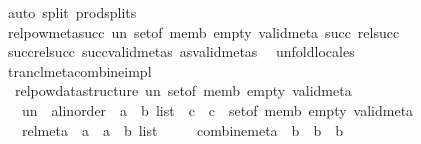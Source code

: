 \begin{isabellebody}
\ {\isacharparenleft}{\kern0pt}auto\ split{\isacharcolon}{\kern0pt}\ prod{\isachardot}{\kern0pt}splits{\isacharparenright}{\kern0pt}%
\endisatagproof
{\isafoldproof}%
%
\isadelimproof
\isanewline
%
\endisadelimproof
\isanewline
{}\isamarkupfalse%
\ relpow{\isacharunderscore}{\kern0pt}meta{\isacharunderscore}{\kern0pt}succ\ un\ set{\isacharunderscore}{\kern0pt}of\ memb\ empty\ valid{\isacharunderscore}{\kern0pt}meta\ succ\ rel{\isacharunderscore}{\kern0pt}succ\isanewline
%
\isadelimproof
\ \ %
\endisadelimproof
%
\isatagproof
{}\isamarkupfalse%
\ succ{\isacharunderscore}{\kern0pt}rel{\isacharunderscore}{\kern0pt}succ\ succ{\isacharunderscore}{\kern0pt}valid{\isacharunderscore}{\kern0pt}metas\ as{\isacharunderscore}{\kern0pt}valid{\isacharunderscore}{\kern0pt}metas\ \isamarkupfalse%
\ unfold{\isacharunderscore}{\kern0pt}locales%
\endisatagproof
{\isafoldproof}%
%
\isadelimproof
\isanewline
%
\endisadelimproof
\isanewline
{}\isamarkupfalse%
\isanewline
\isanewline
{}\isamarkupfalse%
\ trancl{\isacharunderscore}{\kern0pt}meta{\isacharunderscore}{\kern0pt}combine{\isacharunderscore}{\kern0pt}impl\ {\isacharequal}{\kern0pt}\isanewline
\ \ relpow{\isacharunderscore}{\kern0pt}data{\isacharunderscore}{\kern0pt}structure\ un\ set{\isacharunderscore}{\kern0pt}of\ memb\ empty\ valid{\isacharunderscore}{\kern0pt}meta\isanewline
\ \ \ un\ {\isacharcolon}{\kern0pt}{\isacharcolon}{\kern0pt}\ {\isachardoublequoteopen}{\isacharparenleft}{\kern0pt}{\isacharparenleft}{\kern0pt}{\isacharprime}{\kern0pt}a{\isacharcolon}{\kern0pt}{\isacharcolon}{\kern0pt}linorder\ {\isacharasterisk}{\kern0pt}\ {\isacharprime}{\kern0pt}a{\isacharparenright}{\kern0pt}\ {\isacharasterisk}{\kern0pt}\ {\isacharprime}{\kern0pt}b{\isacharparenright}{\kern0pt}\ list\ {\isasymRightarrow}\ {\isacharprime}{\kern0pt}c\ {\isasymRightarrow}\ {\isacharprime}{\kern0pt}c{\isachardoublequoteclose}\ \ set{\isacharunderscore}{\kern0pt}of\ memb\ empty\ valid{\isacharunderscore}{\kern0pt}meta\ {\isacharplus}{\kern0pt}\isanewline
\ \ \ rel{\isacharunderscore}{\kern0pt}meta\ {\isacharcolon}{\kern0pt}{\isacharcolon}{\kern0pt}\ {\isachardoublequoteopen}{\isacharparenleft}{\kern0pt}{\isacharparenleft}{\kern0pt}{\isacharprime}{\kern0pt}a\ {\isasymtimes}\ {\isacharprime}{\kern0pt}a{\isacharparenright}{\kern0pt}\ {\isasymtimes}\ {\isacharprime}{\kern0pt}b{\isacharparenright}{\kern0pt}\ list{\isachardoublequoteclose}\isanewline
\ \ \ \ \ combine{\isacharunderscore}{\kern0pt}meta\ {\isacharcolon}{\kern0pt}{\isacharcolon}{\kern0pt}\ {\isachardoublequoteopen}{\isacharprime}{\kern0pt}b\ {\isasymRightarrow}\ {\isacharprime}{\kern0pt}b\ {\isasymRightarrow}\ {\isacharprime}{\kern0pt}b{\isachardoublequoteclose}\isanewline

\end{isabellebody}
